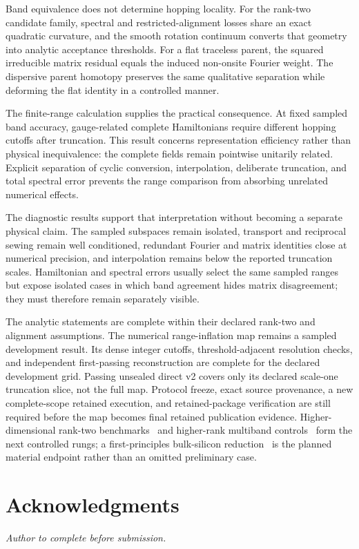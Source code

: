 \documentclass[aps,prb,reprint,amsmath,amssymb,longbibliography,floatfix]{revtex4-2}
\begin{document}
Band equivalence does not determine hopping locality. For the rank-two candidate family,
spectral and restricted-alignment losses share an exact quadratic curvature, and the
smooth rotation continuum converts that geometry into analytic acceptance thresholds.
For a flat traceless parent, the squared irreducible matrix residual equals the induced
non-onsite Fourier weight. The dispersive parent homotopy preserves the same qualitative
separation while deforming the flat identity in a controlled manner.

The finite-range calculation supplies the practical consequence. At fixed sampled band
accuracy, gauge-related complete Hamiltonians require different hopping cutoffs after
truncation. This result concerns representation efficiency rather than physical
inequivalence: the complete fields remain pointwise unitarily related. Explicit
separation of cyclic conversion, interpolation, deliberate truncation, and total
spectral error prevents the range comparison from absorbing unrelated numerical effects.

The diagnostic results support that interpretation without becoming a separate physical
claim. The sampled subspaces remain isolated, transport and reciprocal sewing remain
well conditioned, redundant Fourier and matrix identities close at numerical precision,
and interpolation remains below the reported truncation scales. Hamiltonian and spectral
errors usually select the same sampled ranges but expose isolated cases in which band
agreement hides matrix disagreement; they must therefore remain separately visible.

The analytic statements are complete within their declared rank-two and alignment
assumptions. The numerical range-inflation map remains a sampled development result.
Its dense integer cutoffs, threshold-adjacent resolution checks, and independent
first-passing reconstruction are complete for the declared development grid. Passing
unsealed direct v2 covers only its declared scale-one truncation slice, not the full map.
Protocol freeze, exact source provenance, a new complete-scope retained execution, and
retained-package verification are still required before the map becomes final retained
publication evidence. Higher-dimensional
rank-two benchmarks~\cite{Ragasa2026b} and higher-rank multiband controls~\cite{Ragasa2026c}
form the next controlled rungs; a first-principles bulk-silicon reduction~\cite{Ragasa2026d}
is the planned material endpoint rather than an omitted preliminary case.

\section*{Acknowledgments}
\emph{Author to complete before submission.}
\end{document}

